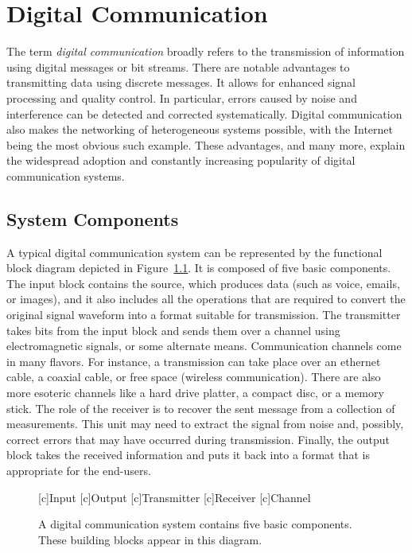 \chapter{Digital Communication}
\label{chapter:DigitalComm}

The term \emph{digital communication} broadly refers to the transmission of information using digital messages or bit streams.
There are notable advantages to transmitting data  using discrete messages.
It allows for enhanced signal processing and quality control.
In particular, errors caused by noise and interference can be detected and corrected systematically.
Digital communication also makes the networking of heterogeneous systems possible, with the Internet being the most obvious such example.
These advantages, and many more, explain the widespread adoption and constantly increasing popularity of digital communication systems.


\section{System Components}

A typical digital communication system can be represented by the functional block diagram depicted in Figure~\ref{figure:BlockDiagram}.
It is composed of five basic components.
The input block contains the source, which produces data (such as voice, emails, or images), and it also includes all the operations that are required to convert the original signal waveform into a format suitable for transmission.
The transmitter takes bits from the input block and sends them over a channel using electromagnetic signals, or some alternate means.
Communication channels come in many flavors.
For instance, a transmission can take place over an ethernet cable, a coaxial cable, or free space (wireless communication).
There are also more esoteric channels like a hard drive platter, a compact disc, or a memory stick.
The role of the receiver is to recover the sent message from a collection of measurements.
This unit may need to extract the signal from noise and, possibly, correct errors that may have occurred during transmission.
Finally, the output block takes the received information and puts it back into a format that is appropriate for the end-users.

\begin{figure}[htbp]
\begin{center}
\begin{psfrags}
[c]{Input}
[c]{Output}
[c]{Transmitter}
[c]{Receiver}
[c]{Channel}
\end{psfrags}
\end{center}
\caption{A digital communication system contains five basic components.
These building blocks appear in this diagram.}
\label{figure:BlockDiagram}
\end{figure}

